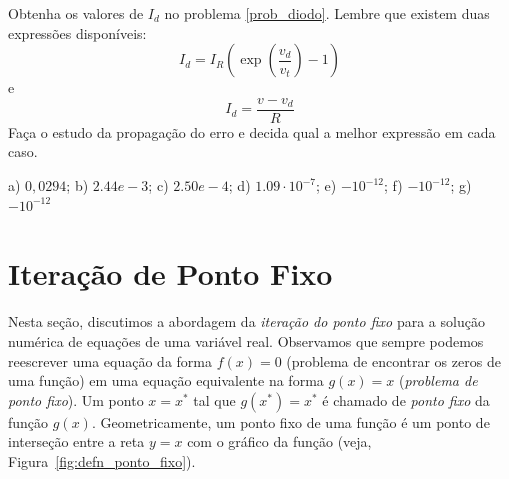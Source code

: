 \begin{Exercise}[title= Propagação de erros] Obtenha os valores de $I_d$ no problema \ref{prob_diodo}. Lembre que existem duas expressões disponíveis:
  \begin{equation*}
    I_d=I_R\left(\exp\left(\frac{v_d}{v_t}\right)-1\right)  
  \end{equation*}
e
\begin{equation*}
  I_d=\frac{v-v_d}{R}
\end{equation*}
Faça o estudo da propagação do erro e decida qual a melhor expressão em cada caso.
\end{Exercise}
\begin{Answer}
  \begin{tiny}
  a) $0,0294$; b) $2.44e-3$; c) $2.50e-4$; d) $1.09\cdot 10^{-7}$; e) $- 10^{-12}$; f) $-10^{-12}$; g) $- 10^{-12}$  
  \end{tiny}
\end{Answer}


\section{Iteração de Ponto Fixo}

Nesta seção, discutimos a abordagem da \emph{iteração do ponto fixo} para a solução numérica de equações de uma variável real. Observamos que sempre podemos reescrever uma equação da forma $f(x) = 0$ (problema de encontrar os zeros de uma função) em uma equação equivalente na forma $g(x) = x$ (\emph{problema de ponto fixo}). Um ponto $x = x^*$ tal que $g(x^*) = x^*$ é chamado de \emph{ponto fixo} da função $g(x)$. Geometricamente, um ponto fixo de uma função é um ponto de interseção entre a reta $y = x$ com o gráfico da função (veja, Figura~\ref{fig:defn_ponto_fixo}).

